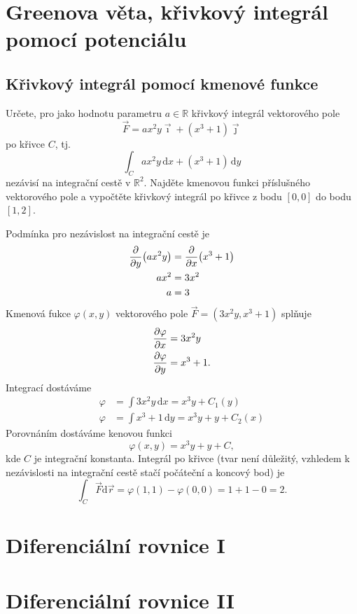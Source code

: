 \section{Greenova věta, křivkový integrál pomocí potenciálu}

\subsection{Křivkový integrál pomocí kmenové funkce}


Určete, pro jako hodnotu parametru $a\in \mathbb R$ křivkový integrál vektorového pole $$\vec F=ax^2y\vec\imath + (x^3+1)\vec\jmath$$ po křivce $C$, tj. $$\int_C ax^2y\,\mathrm dx+(x^3+1)\,\mathrm dy$$ nezávisí na integrační cestě v $\mathbb R^2$. Najděte kmenovou funkci příslušného vektorového pole a vypočtěte křivkový integrál po křivce z bodu $[0,0]$ do bodu $[1,2]$.

\reseni

Podmínka pro nezávislost na integrační cestě je $$
\begin{aligned}
  \pdv{y}(ax^2y)&=\pdv{x}(x^3+1)\\
  ax^2&=3x^2\\
  a&=3
\end{aligned}
$$
Kmenová fukce $\varphi(x,y)$ vektorového pole $\vec F=(3x^2y,x^3+1)$ splňuje
$$
\begin{aligned}
  \pdv{\varphi}{x}&=3x^2y \\  \pdv{\varphi}{y}&=x^3+1.
\end{aligned}
$$
Integrací dostáváme
$$
\begin{aligned}
  \varphi &= \int 3x^2y\,\mathrm dx=x^3y+C_1(y)\\
  \varphi &= \int x^3+1\,\mathrm dy=x^3y+y+C_2(x)
\end{aligned}
$$
Porovnáním dostáváme kenovou funkci $$\varphi (x,y)=x^3y+y+C,$$ kde $C$ je integrační konstanta. Integrál po křivce (tvar není důležitý, vzhledem k nezávislosti na integrační cestě stačí počáteční a koncový bod) je
$$\int _C \vec F\mathrm d\vec r=\varphi(1,1)-\varphi(0,0)=1+1-0=2.$$


\konec



\section{Diferenciální rovnice I}

\section{Diferenciální rovnice II}

